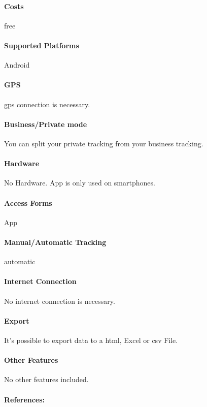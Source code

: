 \paragraph{Costs} free
\paragraph{Supported Platforms} Android 
\paragraph{GPS} \gls{gps} connection is necessary.
\paragraph{Business/Private mode} You can split your private tracking from your business tracking.
\paragraph{Hardware} No Hardware. App is only used on smartphones.
\paragraph{Access Forms} App
\paragraph{Manual/Automatic Tracking} automatic
\paragraph{Internet Connection} No internet connection is necessary.
\paragraph{Export} It’s possible to export data to a \gls{html}, Excel or \gls{csv} File.
\paragraph{Other Features} No other features included.
\paragraph{References:} \cite{Mileage_Logbook}
\newpage

